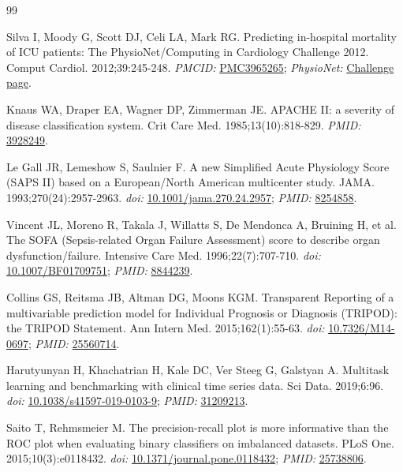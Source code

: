 \documentclass[10pt,twocolumn,letterpaper]{article}
\begin{document}
\begin{thebibliography}{99}

Silva I, Moody G, Scott DJ, Celi LA, Mark RG. Predicting in-hospital mortality of ICU patients: The PhysioNet/Computing in Cardiology Challenge 2012. Comput Cardiol. 2012;39:245-248. \textit{PMCID:} \href{https://pmc.ncbi.nlm.nih.gov/articles/PMC3965265/}{PMC3965265}; \textit{PhysioNet:} \href{https://physionet.org/content/challenge-2012/1.0.0/}{Challenge page}.

Knaus WA, Draper EA, Wagner DP, Zimmerman JE. APACHE II: a severity of disease classification system. Crit Care Med. 1985;13(10):818-829. \textit{PMID:} \href{https://pubmed.ncbi.nlm.nih.gov/3928249/}{3928249}.

Le Gall JR, Lemeshow S, Saulnier F. A new Simplified Acute Physiology Score (SAPS II) based on a European/North American multicenter study. JAMA. 1993;270(24):2957-2963. \textit{doi:} \href{https://doi.org/10.1001/jama.270.24.2957}{10.1001/jama.270.24.2957}; \textit{PMID:} \href{https://pubmed.ncbi.nlm.nih.gov/8254858/}{8254858}.

Vincent JL, Moreno R, Takala J, Willatts S, De Mendonca A, Bruining H, et al. The SOFA (Sepsis-related Organ Failure Assessment) score to describe organ dysfunction/failure. Intensive Care Med. 1996;22(7):707-710. \textit{doi:} \href{https://doi.org/10.1007/BF01709751}{10.1007/BF01709751}; \textit{PMID:} \href{https://pubmed.ncbi.nlm.nih.gov/8844239/}{8844239}.

Collins GS, Reitsma JB, Altman DG, Moons KGM. Transparent Reporting of a multivariable prediction model for Individual Prognosis or Diagnosis (TRIPOD): the TRIPOD Statement. Ann Intern Med. 2015;162(1):55-63. \textit{doi:} \href{https://doi.org/10.7326/M14-0697}{10.7326/M14-0697}; \textit{PMID:} \href{https://pubmed.ncbi.nlm.nih.gov/25560714/}{25560714}.

Harutyunyan H, Khachatrian H, Kale DC, Ver Steeg G, Galstyan A. Multitask learning and benchmarking with clinical time series data. Sci Data. 2019;6:96. \textit{doi:} \href{https://doi.org/10.1038/s41597-019-0103-9}{10.1038/s41597-019-0103-9}; \textit{PMID:} \href{https://pubmed.ncbi.nlm.nih.gov/31209213/}{31209213}.

Saito T, Rehmsmeier M. The precision-recall plot is more informative than the ROC plot when evaluating binary classifiers on imbalanced datasets. PLoS One. 2015;10(3):e0118432. \textit{doi:} \href{https://doi.org/10.1371/journal.pone.0118432}{10.1371/journal.pone.0118432}; \textit{PMID:} \href{https://pubmed.ncbi.nlm.nih.gov/25738806/}{25738806}.


\end{thebibliography}
\end{document}
